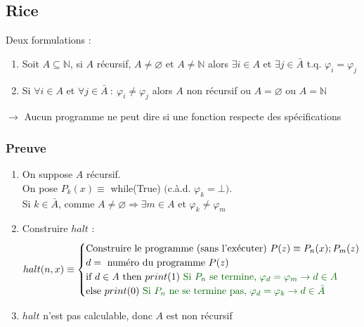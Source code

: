\subsection{Rice}

Deux formulations :
\begin{enumerate}
\item Soit $A \subseteq \mathbb{N}$, si $A$ récursif, $A \neq \varnothing$ et $A \neq \mathbb{N}$ alors $\exists i \in A$ et $\exists j \in \bar{A}$ t.q. $\varphi_i = \varphi_j$
\item Si $\forall i \in A$ et $\forall j \in \bar{A} \ : \ \varphi_i \neq \varphi_j$ alors $A$ non récursif ou $A = \varnothing$ ou $A = \mathbb{N}$
\end{enumerate}
$\rightarrow$ Aucun programme ne peut dire si une fonction respecte des spécifications


\subsubsection{Preuve}

\begin{enumerate}
\item On suppose $A$ récursif.\\
	On pose $P_k(x) \equiv$ while(True) $($c.à.d. $\varphi_k = \bot)$.\\
	Si $k \in \bar{A}$, comme $A \neq \varnothing \Rightarrow \exists m \in A$ et $\varphi_k \neq \varphi_m$
\item Construire $halt$ :
	\begin{equation*}
		 halt(n,x) \equiv
		 \begin{cases}
		 \text{Construire le programme (sans l'exécuter) } P(z) \equiv P_n(x); P_m(z)\\
		 d = \text{ numéro du programme }P(z)\\
		 \text{if } d \in A \text{ then } print(1) \ \textgreen{\text{Si }P_n \text{ se termine, } \varphi_d = \varphi_m \rightarrow d \in A}\\
		 \text{else } print(0) \ \textgreen{\text{Si }P_n \text{ ne se termine pas, } \varphi_d = \varphi_k \rightarrow d \in \bar{A}}\\
		 \end{cases}
	\end{equation*}
\item $halt$ n'est pas calculable, donc $A$ est non récursif
\end{enumerate}


